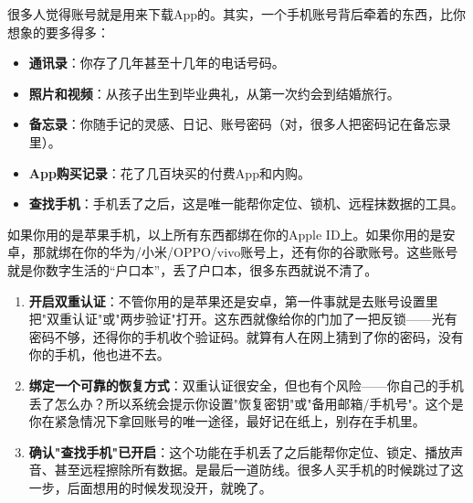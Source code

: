 


很多人觉得账号就是用来下载App的。其实，一个手机账号背后牵着的东西，比你想象的要多得多：

\begin{itemize}
  \item \textbf{通讯录}：你存了几年甚至十几年的电话号码。
  \item \textbf{照片和视频}：从孩子出生到毕业典礼，从第一次约会到结婚旅行。
  \item \textbf{备忘录}：你随手记的灵感、日记、账号密码（对，很多人把密码记在备忘录里）。
  \item \textbf{App购买记录}：花了几百块买的付费App和内购。
  \item \textbf{查找手机}：手机丢了之后，这是唯一能帮你定位、锁机、远程抹数据的工具。
\end{itemize}

如果你用的是苹果手机，以上所有东西都绑在你的Apple ID上。如果你用的是安卓，那就绑在你的华为/小米/OPPO/vivo账号上，还有你的谷歌账号。这些账号就是你数字生活的“户口本”，丢了户口本，很多东西就说不清了。


\begin{enumerate}
  \item \textbf{开启双重认证}：不管你用的是苹果还是安卓，第一件事就是去账号设置里把"双重认证"或"两步验证"打开。这东西就像给你的门加了一把反锁——光有密码不够，还得你的手机收个验证码。就算有人在网上猜到了你的密码，没有你的手机，他也进不去。
  \item \textbf{绑定一个可靠的恢复方式}：双重认证很安全，但也有个风险——你自己的手机丢了怎么办？所以系统会提示你设置"恢复密钥"或"备用邮箱/手机号"。这个是你在紧急情况下拿回账号的唯一途径，最好记在纸上，别存在手机里。
  \item \textbf{确认"查找手机"已开启}：这个功能在手机丢了之后能帮你定位、锁定、播放声音、甚至远程擦除所有数据。是最后一道防线。很多人买手机的时候跳过了这一步，后面想用的时候发现没开，就晚了。
\end{enumerate}


